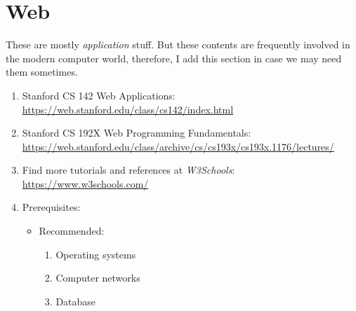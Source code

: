 \documentclass{article}
\begin{document}
\section{Web}
These are mostly \emph{application} stuff.
But these contents are frequently involved in the modern computer world, therefore, I add this section in case we may need them sometimes.
\begin{enumerate}
    \item Stanford CS 142 Web Applications:\\
    \href{https://web.stanford.edu/class/cs142/index.html}{https://web.stanford.edu/class/cs142/index.html}
    \item Stanford CS 192X Web Programming Fundamentals:\\
    \href{https://web.stanford.edu/class/archive/cs/cs193x/cs193x.1176/lectures/}{https://web.stanford.edu/class/archive/cs/cs193x/cs193x.1176/lectures/}
    \item Find more tutorials and references at \emph{W3Schools}:
    \href{https://www.w3schools.com/}{https://www.w3schools.com/}
    \item Prerequisites:
    \begin{itemize}
        \item Recommended:
        \begin{enumerate}
            \item Operating systems
            \item Computer networks
            \item Database
        \end{enumerate}
    \end{itemize}
\end{enumerate}
\end{document}
